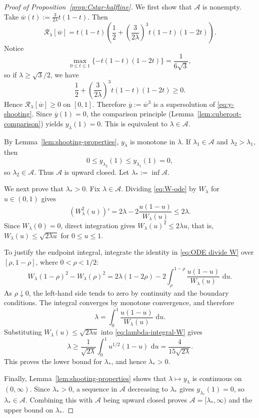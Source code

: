\documentclass[12pt]{amsart}
\numberwithin{equation}{section}
\theoremstyle{plain}
\theoremstyle{definition}
\newcommand{\dd}{\,\mathrm d}
\begin{document}
\begin{proof}[Proof of Proposition~\ref{prop:Cstar-halfline}]
We first show that \(\mathcal A\) is nonempty. Take \(\overline w(t):=\frac{3}{2\lambda}t(1-t)\).
Then
\[
 \mathcal R_\lambda[\overline w]
 =t(1-t)\left(\frac{1}{2}+\left(\frac{3}{2\lambda}\right)^3t(1-t)(1-2t)\right).
\]
Notice
\[
 \max_{0\le t\le1}\{-t(1-t)(1-2t)\}=\frac1{6\sqrt3},
\]
so if \(\lambda\ge\sqrt3/2\), we have
\[
\frac{1}{2}+\left(\frac{3}{2\lambda}\right)^3t(1-t)(1-2t) \ge 0.
\]
Hence
\(\mathcal R_\lambda[\overline w]\ge0\) on \([0,1]\).  Therefore \(\overline y:=\overline w^3\) is a supersolution of
\eqref{eq:y-shooting}.  Since $\overline y(1)=0$, the comparison
principle (Lemma~\ref{lem:cuberoot-comparison}) yields
\(y_\lambda(1)=0\). This is equivalent to \(\lambda\in\mathcal A\).

By Lemma~\ref{lem:shooting-properties}, $y_\lambda$ is monotone in
$\lambda$.  If $\lambda_1\in\mathcal A$ and $\lambda_2>\lambda_1$, then
\[
 0\le y_{\lambda_2}(1)\le y_{\lambda_1}(1)=0,
\]
so $\lambda_2\in\mathcal A$.  Thus $\mathcal A$ is upward closed.  Let
$\lambda_*:=\inf\mathcal A$.

We next prove that $\lambda_*>0$.  Fix $\lambda\in\mathcal A$.  Dividing
\eqref{eq:W-ode} by $W_\lambda$ for $u\in(0,1)$ gives
\begin{equation}
 (W_\lambda^2(u))'
 =2\lambda-2\frac{u(1-u)}{W_\lambda(u)}
 \le2\lambda.
 \label{eq:ODE divide W}
\end{equation}
Since $W_\lambda(0)=0$, direct integration gives
$W_\lambda(u)^2\le2\lambda u$, that is,
$W_\lambda(u)\le\sqrt{2\lambda u}$ for $0\le u\le1$.

To justify the endpoint integral, integrate the identity in
\eqref{eq:ODE divide W} over $[\rho,1-\rho]$, where $0<\rho<1/2$:
\[
 W_\lambda(1-\rho)^2-W_\lambda(\rho)^2
 =2\lambda(1-2\rho)
  -2\int_\rho^{1-\rho}
      \frac{u(1-u)}{W_\lambda(u)}\,\dd u.
\]
As $\rho\downarrow0$, the left-hand side tends to zero by continuity and
the boundary conditions.  The integral converges by monotone convergence,
and therefore
\begin{equation}
 \lambda=\int_0^1\frac{u(1-u)}{W_\lambda(u)}\,\dd u.
 \label{eq:lambda-integral-W}
\end{equation}
Substituting $W_\lambda(u)\le\sqrt{2\lambda u}$ into
\eqref{eq:lambda-integral-W} gives
\[
 \lambda\ge\frac1{\sqrt{2\lambda}}
 \int_0^1u^{1/2}(1-u)\,\dd u
 =\frac4{15\sqrt{2\lambda}}.
\]
This proves the lower bound for $\lambda_*$, and hence
$\lambda_*>0$.

Finally, Lemma~\ref{lem:shooting-properties} shows that
$\lambda\mapsto y_\lambda$ is continuous on $(0,\infty)$.  Since
$\lambda_*>0$, a sequence in $\mathcal A$ decreasing to $\lambda_*$ gives
$y_{\lambda_*}(1)=0$, so $\lambda_*\in\mathcal A$.  Combining this with $\mathcal{A}$ being upward closed proves $\mathcal A=[\lambda_*,\infty)$ and the upper bound on $\lambda_*$.
\end{proof}
\end{document}
